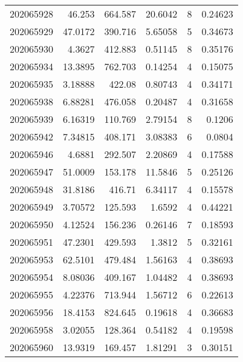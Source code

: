 \begin{tabular}{rrrrrr}
 202065928 &         46.253   &      664.587  &           20.6042  &           8 & 0.24623 \\
 202065929 &         47.0172  &      390.716  &            5.65058 &           5 & 0.34673 \\
 202065930 &          4.3627  &      412.883  &            0.51145 &           8 & 0.35176 \\
 202065934 &         13.3895  &      762.703  &            0.14254 &           4 & 0.15075 \\
 202065935 &          3.18888 &      422.08   &            0.80743 &           4 & 0.34171 \\
 202065938 &          6.88281 &      476.058  &            0.20487 &           4 & 0.31658 \\
 202065939 &          6.16319 &      110.769  &            2.79154 &           8 & 0.1206  \\
 202065942 &          7.34815 &      408.171  &            3.08383 &           6 & 0.0804  \\
 202065946 &          4.6881  &      292.507  &            2.20869 &           4 & 0.17588 \\
 202065947 &         51.0009  &      153.178  &           11.5846  &           5 & 0.25126 \\
 202065948 &         31.8186  &      416.71   &            6.34117 &           4 & 0.15578 \\
 202065949 &          3.70572 &      125.593  &            1.6592  &           4 & 0.44221 \\
 202065950 &          4.12524 &      156.236  &            0.26146 &           7 & 0.18593 \\
 202065951 &         47.2301  &      429.593  &            1.3812  &           5 & 0.32161 \\
 202065953 &         62.5101  &      479.484  &            1.56163 &           4 & 0.38693 \\
 202065954 &          8.08036 &      409.167  &            1.04482 &           4 & 0.38693 \\
 202065955 &          4.22376 &      713.944  &            1.56712 &           6 & 0.22613 \\
 202065956 &         18.4153  &      824.645  &            0.19618 &           4 & 0.36683 \\
 202065958 &          3.02055 &      128.364  &            0.54182 &           4 & 0.19598 \\
 202065960 &         13.9319  &      169.457  &            1.81291 &           3 & 0.30151 \\

\end{tabular}
